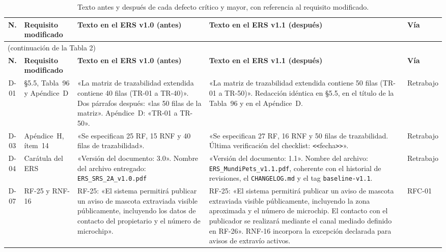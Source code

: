 \documentclass[journal,onecolumn]{IEEEtran}
\begin{document}
	\begin{longtable}{
			|c
			|>{\raggedright\arraybackslash}p{2.3cm}
			|>{\raggedright\arraybackslash}p{5.5cm}
			|>{\raggedright\arraybackslash}p{5.5cm}
			|>{\raggedright\arraybackslash}p{1.6cm}|
		}
		\caption{Texto antes y después de cada defecto crítico y mayor, con
			referencia al requisito modificado.} \label{tab:antes-despues-criticos} \\
		\hline
		\textbf{N.\textordmasculine{}} & \textbf{Requisito modificado} & \textbf{Texto en el ERS v1.0 (antes)} & \textbf{Texto en el ERS v1.1 (después)} & \textbf{Vía} \\
		\hline
		\endfirsthead
		\multicolumn{5}{l}{(continuación de la Tabla 2)} \\
		\hline
		\textbf{N.\textordmasculine{}} & \textbf{Requisito modificado} & \textbf{Texto en el ERS v1.0 (antes)} & \textbf{Texto en el ERS v1.1 (después)} & \textbf{Vía} \\
		\hline
		\endhead
		\hline
		\endfoot
		D-01 & \S5.5, Tabla~96 y Apéndice~D &
		«La matriz de trazabilidad extendida contiene 40 filas (TR-01 a
		TR-40)». Dos párrafos después: «las 50 filas de la matriz». Apéndice~D:
		«TR-01 a TR-50». &
		«La matriz de trazabilidad extendida contiene 50 filas (TR-01 a
		TR-50)». Redacción idéntica en \S5.5, en el título de la Tabla~96 y en
		el Apéndice~D. & Retrabajo \\
		\hline
		D-03 & Apéndice~H, ítem~14 &
		«Se especifican 25 RF, 15 RNF y 40 filas de trazabilidad». &
		«Se especifican 27 RF, 16 RNF y 50 filas de trazabilidad.
		Última verificación del checklist: \texttt{<}\texttt{<}fecha\texttt{>}\texttt{>}». & Retrabajo \\
		\hline
		D-04 & Carátula del ERS &
		«Versión del documento: 3.0». Nombre del archivo entregado:
		\texttt{ERS\_SRS\_2A\_v1.0.pdf} &
		«Versión del documento: 1.1». Nombre del archivo:
		\texttt{ERS\_MundiPets\_v1.1.pdf}, coherente con el historial de
		revisiones, el \texttt{CHANGELOG.md} y el tag
		\texttt{baseline-v1.1}. & Retrabajo \\
		\hline
		D-07 & RF-25 y RNF-16 &
		RF-25: «El sistema permitirá publicar un aviso de mascota
		extraviada visible públicamente, incluyendo los datos de contacto del
		propietario y el número de microchip». &
		RF-25: «El sistema permitirá publicar un aviso de mascota
		extraviada visible públicamente, incluyendo la zona aproximada y el
		número de microchip. El contacto con el publicador se realizará
		mediante el canal mediado definido en RF-26». RNF-16 incorpora la
		excepción declarada para avisos de extravío activos. & RFC-01 \\

\end{longtable}
\end{document}
